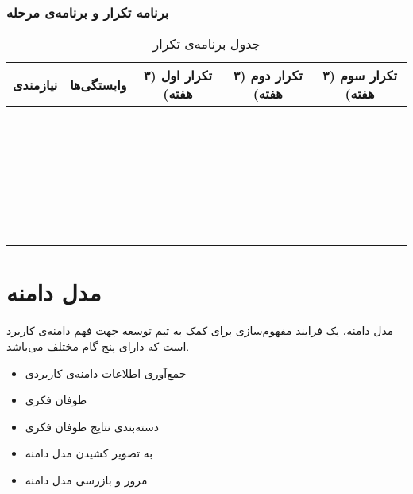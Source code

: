 \documentclass[12pt,svgnames,oneside]{book}
\begin{document}
\subsection{برنامه تکرار و برنامه‌ی مرحله}
\begin{center}
\begin{longtable}{|c|c|c|c|c|}
\caption{جدول برنامه‌ی تکرار}
\endfirsthead
\endhead
\hline
نیازمندی & 
وابستگی‌ها & 
تکرار اول (۳ هفته) & 
تکرار دوم  (۳ هفته) & تکرار سوم  (۳ هفته) \\
\hline
\hline
& & & & \\ \hline
& & & & \\ \hline
& & & & \\ \hline
& & & & \\ \hline
& & & & \\ \hline
& & & & \\ \hline
& & & & \\ \hline
& & & & \\ \hline
& & & & \\ \hline
& & & & \\ \hline
& & & & \\ \hline
& & & & \\ \hline
& & & & \\ \hline
& & & & \\ \hline
& & & & \\ \hline
& & & & \\ \hline
& & & & \\ \hline
& & & & \\ \hline
& & & & \\ \hline
& & & & \\ \hline
& & & & \\ \hline
& & & & \\ \hline
& & & & \\ \hline
& & & & \\ \hline
& & & & \\ \hline
& & & & \\ \hline
& & & & \\ \hline
& & & & \\ \hline
& & & & \\ \hline
\end{longtable}
\end{center}

\chapter{مدل دامنه}
مدل دامنه، یک فرایند مفهوم‌سازی برای کمک به تیم توسعه جهت فهم دامنه‌ی کاربرد است که دارای پنج گام مختلف می‌باشد.
\begin{itemize}
\item
جمع‌آوری اطلاعات دامنه‌‌ی کاربردی
\item
طوفان فکری
\item
دسته‌بندی نتایج طوفان فکری
\item
به تصویر کشیدن مدل دامنه
\item
مرور و بازرسی مدل دامنه
\end{itemize}
\end{document}
